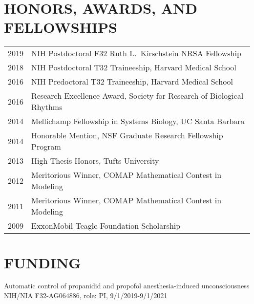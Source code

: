 \documentclass[line,10pt]{res}
\begin{document}
\begin{resume}
\section{\bf HONORS, AWARDS, AND FELLOWSHIPS}
\vspace{1em}
\begin{tabular}{p{1.0in} p{5.5in}}
2019 & NIH Postdoctoral F32 Ruth L.\ Kirschstein NRSA Fellowship \\
2018 & NIH Postdoctoral T32 Traineeship, Harvard Medical School \\
2016 & NIH Predoctoral T32 Traineeship, Harvard Medical School \\
2016 & Research Excellence Award, Society for Research of Biological Rhythms\\
2014 & Mellichamp Fellowship in Systems Biology, UC Santa Barbara\\
2014 & Honorable Mention, NSF Graduate Research Fellowship Program\\
2013 & High Thesis Honors, Tufts University\\
2012 & Meritorious Winner, COMAP Mathematical Contest in Modeling\\
2011 & Meritorious Winner, COMAP Mathematical Contest in Modeling\\
2009 & ExxonMobil Teagle Foundation Scholarship\\
\end{tabular}

\section{\bf FUNDING}
\vspace{1em}
Automatic control of propanidid and propofol anesthesia-induced unconsciousness\\ 
NIH/NIA F32-AG064886, role: PI, 9/1/2019-9/1/2021



\end{resume}
\end{document}
